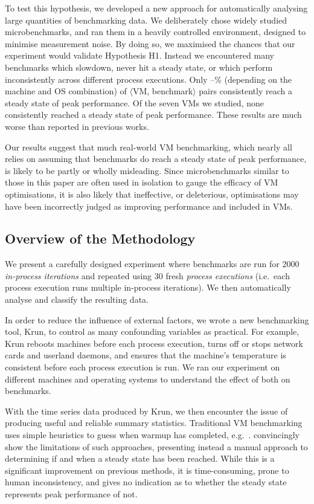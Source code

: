 \documentclass[acmsmall]{acmart}\settopmatter{printfolios=true}
\newcommand{\krun}{Krun\xspace}
\newcommand{\hypone}{H1\xspace}
\newcommand{\vmbpair}{$\langle$VM, benchmark$\rangle$\xspace}
\newcommand{\numpexecs}{30\xspace}
\newcommand{\numiterations}{2000\xspace}
\begin{document}
To test this hypothesis, we developed a new approach for
automatically analysing large quantities of benchmarking data. We deliberately chose
widely studied microbenchmarks, and ran them in a heavily
controlled environment, designed to minimise measurement noise. By doing so, we
maximised the chances that our experiment would validate Hypothesis \hypone. Instead
we encountered many benchmarks which slowdown, never hit a steady
state, or which perform inconsistently across different process
executions. Only \mintwo--\maxtwo\% (depending on the machine and OS
combination) of \vmbpair pairs consistently reach a steady state of peak
performance. Of the seven VMs we studied, none consistently reached a steady
state of peak performance. These results are much worse than reported in previous works.

Our results suggest
that much real-world VM benchmarking, which nearly all relies on assuming
that benchmarks do reach a steady state of peak performance, is likely to be partly or wholly
misleading. Since microbenchmarks similar to those in this paper are often used
in isolation to gauge the efficacy of VM optimisations, it is also likely that
ineffective, or deleterious, optimisations may have been incorrectly judged as
improving performance and included in VMs.


\subsection{Overview of the Methodology}

We present a carefully designed experiment where benchmarks are run for \numiterations
\emph{in-process iterations} and repeated using \numpexecs fresh \emph{process
executions} (i.e.~each process execution runs multiple in-process iterations).
We then automatically analyse and classify the resulting data.

In order to reduce the influence of external factors, we wrote a new
benchmarking tool, \krun, to control as many confounding variables as practical.
For example, \krun reboots machines before each process execution, turns off or stops network
cards and userland daemons, and ensures that the
machine's temperature is consistent before each process execution is run.
We ran our experiment on different machines and operating systems to understand
the effect of both on benchmarks.

With the time series data produced by \krun, we then encounter the issue of
producing useful and reliable summary statistics. Traditional VM benchmarking
uses simple heuristics to guess when warmup has completed,
e.g.~\citet{georges07statistically}. \citet{kalibera13rigorous} convincingly show the limitations of such approaches,
presenting instead a manual approach to determining
if and when a steady state has been reached. While this is a significant improvement on
previous methods, it is time-consuming, prone to human inconsistency, and gives no
indication as to whether the steady state represents peak performance of not.
\end{document}
